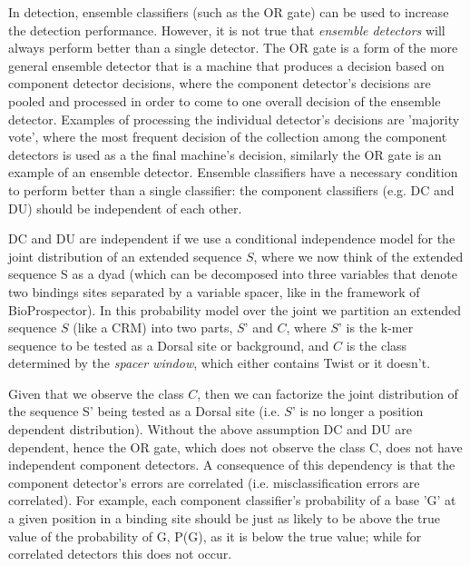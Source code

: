  In detection, ensemble classifiers (such as the OR gate) can be used to increase the detection performance\cite{bishop}.  However, it is not true that \textit{ensemble detectors} will always perform better than a single detector.  The OR gate is a form of the more general ensemble detector that is a machine that produces a decision based on component detector decisions, where the component detector's decisions are pooled and processed in order to come to one overall decision of the ensemble detector.  Examples of processing the individual detector's decisions are 'majority vote', where the most frequent decision of the collection among the component detectors is used as a the final machine's decision, similarly the OR gate is an example of an ensemble detector.  Ensemble classifiers have a necessary condition to perform better than a single classifier: the component classifiers (e.g. DC and DU) should be independent of each other\cite{bishop}.

DC and DU are independent if we use a conditional independence model for the joint distribution of an extended sequence $S$, where we now think of the extended sequence S as a dyad (which can be decomposed into three variables that denote two bindings sites separated by a variable spacer, like in the framework of BioProspector).   In this probability model over the joint we partition an extended sequence $S$ (like a CRM) into two parts, $S$' and $C$, where $S$' is the k-mer sequence to be tested as a Dorsal site or background, and $C$ is the class determined by the \textit{spacer window}, which either contains Twist or it doesn't.

Given that we observe the class $C$, then we can factorize the joint distribution of the sequence S' being tested as a Dorsal site (i.e. $S$' is no longer a position dependent distribution). Without the above assumption DC and DU are dependent, hence the OR gate, which does not observe the class C, does not have independent component detectors.  A consequence of this dependency is that the component detector's errors are correlated (i.e. misclassification errors are correlated).  For example, each component classifier's probability of a base 'G' at a given position in a binding site should be just as likely to be above the true value of the probability of G, P(G), as it is below the true value; while for correlated detectors this does not occur.

